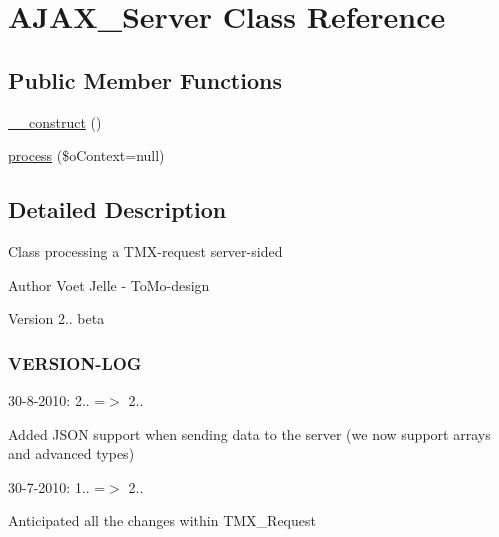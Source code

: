 \hypertarget{class_a_j_a_x___server}{\section{A\-J\-A\-X\-\_\-\-Server Class Reference}
\label{class_a_j_a_x___server}
}
\subsection*{Public Member Functions}
\begin{DoxyCompactItemize}
\item 
\hyperlink{class_a_j_a_x___server_adfc5e2ea55215e07ced413bf46e3a8f4}{\-\_\-\-\_\-construct} ()
\item 
\hyperlink{class_a_j_a_x___server_ae6059a2c59fc8b99b525d6651f35e2a9}{process} (\$o\-Context=null)
\end{DoxyCompactItemize}


\subsection{Detailed Description}
Class processing a T\-M\-X-\/request server-\/sided

\begin{DoxyAuthor}{Author}
Voet Jelle -\/ To\-Mo-\/design 
\end{DoxyAuthor}
\begin{DoxyVersion}{Version}
2.. beta
\end{DoxyVersion}
\subsubsection*{V\-E\-R\-S\-I\-O\-N-\/\-L\-O\-G }

30-\/8-\/2010\-: 2.. =$>$ 2..
\begin{DoxyItemize}
\item Added J\-S\-O\-N support when sending data to the server (we now support arrays and advanced types)
\end{DoxyItemize}

30-\/7-\/2010\-: 1.. =$>$ 2..
\begin{DoxyItemize}
\item Anticipated all the changes within T\-M\-X\-\_\-\-Request 
\end{DoxyItemize}


